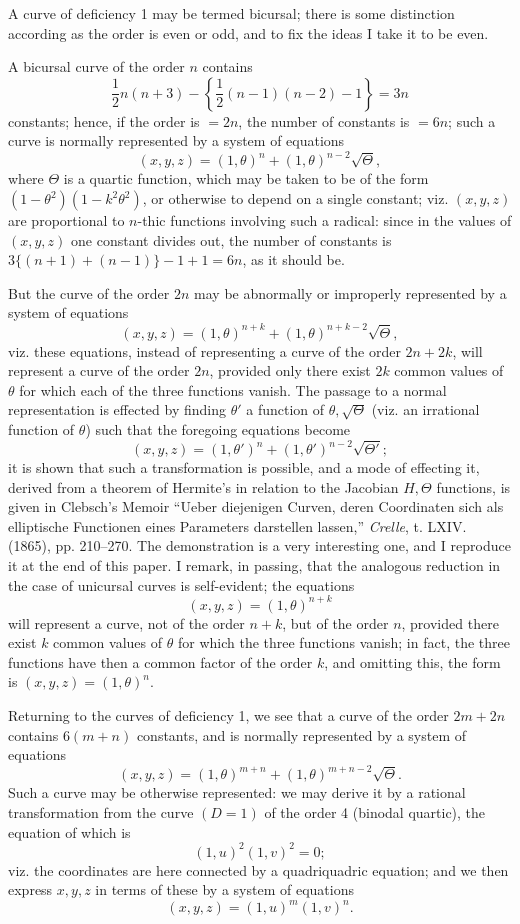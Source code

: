 \documentclass[11pt,a4paper]{article}
\begin{document}
A curve of deficiency 1 may be termed bicursal; there is some distinction according as the
order is even or odd, and to fix the ideas I take it to be even.

A bicursal curve of the order $n$ contains
\[
 \frac12 n(n+3)-\left\{\frac12(n-1)(n-2)-1\right\}=3n
\]
constants; hence, if the order is $=2n$, the number of constants is $=6n$; such a curve is
normally represented by a system of equations
\[
 (x,y,z)=(1,\theta)^n+(1,\theta)^{n-2}\sqrt\Theta,
\]
where $\Theta$ is a quartic function, which may be taken to be of the form
$(1-\theta^2)(1-k^2\theta^2)$, or otherwise to depend on a single constant; viz.
$(x,y,z)$ are proportional to $n$-thic functions involving such a radical: since in the
values of $(x,y,z)$ one constant divides out, the number of constants is
$3\{(n+1)+(n-1)\}-1+1=6n$, as it should be.

But the curve of the order $2n$ may be abnormally or improperly represented by a system of
equations
\[
 (x,y,z)=(1,\theta)^{n+k}+(1,\theta)^{n+k-2}\sqrt\Theta,
\]
viz. these equations, instead of representing a curve of the order $2n+2k$, will represent
a curve of the order $2n$, provided only there exist $2k$ common values of $\theta$ for which
each of the three functions vanish. The passage to a normal representation is effected by
finding $\theta'$ a function of $\theta,\sqrt\Theta$ (viz. an irrational function of $\theta$)
such that the foregoing equations become
\[
 (x,y,z)=(1,\theta')^n+(1,\theta')^{n-2}\sqrt{\Theta'};
\]
it is shown that such a transformation is possible, and a mode of effecting it, derived from
a theorem of Hermite's in relation to the Jacobian $H,\Theta$ functions, is given in Clebsch's
Memoir ``Ueber diejenigen Curven, deren Coordinaten sich als elliptische Functionen eines
Parameters darstellen lassen,'' \emph{Crelle}, t. LXIV. (1865), pp. 210--270. The
demonstration is a very interesting one, and I reproduce it at the end of this paper. I remark,
in passing, that the analogous reduction in the case of unicursal curves is self-evident;
the equations
\[
 (x,y,z)=(1,\theta)^{n+k}
\]
will represent a curve, not of the order $n+k$, but of the order $n$, provided there exist
$k$ common values of $\theta$ for which the three functions vanish; in fact, the three
functions have then a common factor of the order $k$, and omitting this, the form is
$(x,y,z)=(1,\theta)^n$.

Returning to the curves of deficiency 1, we see that a curve of the order $2m+2n$ contains
$6(m+n)$ constants, and is normally represented by a system of equations
\[
 (x,y,z)=(1,\theta)^{m+n}+(1,\theta)^{m+n-2}\sqrt\Theta.
\]
Such a curve may be otherwise represented: we may derive it by a rational transformation
from the curve $(D=1)$ of the order 4 (binodal quartic), the equation of which is
\[
 (1,u)^2(1,v)^2=0;
\]
viz. the coordinates are here connected by a quadriquadric equation; and we then express
$x,y,z$ in terms of these by a system of equations
\[
 (x,y,z)=(1,u)^m(1,v)^n.
\]
\end{document}
